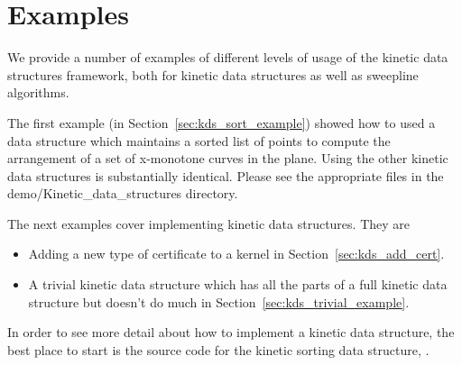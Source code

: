 \section{Examples}
\label{sec:kds_examples}

We provide a number of examples of different levels of usage of the
kinetic data structures framework, both for kinetic data structures as
well as sweepline algorithms.

The first example (in Section~\ref{sec:kds_sort_example}) showed
how to used a data structure which maintains a sorted list of points
to compute the arrangement of a set of x-monotone curves in the
plane. Using the other kinetic data structures is substantially
identical. Please see the appropriate files in the
demo/Kinetic\_data\_structures directory.

The next examples cover implementing kinetic data structures. They are
\begin{itemize}
\item Adding a new type of certificate to a kernel in
  Section~\ref{sec:kds_add_cert}.
\item A trivial kinetic data structure which has all the parts of a
full kinetic data structure but doesn't do much in
Section~\ref{sec:kds_trivial_example}.
\end{itemize}

In order to see more detail about how to implement a kinetic data
structure, the best place to start is the source code for the kinetic
sorting data structure, .




